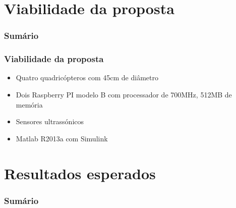 \documentclass{beamer}
\begin{document}
\section{Viabilidade da proposta}

\begin{frame}
	\frametitle{Sumário}
	\tableofcontents[currentsection]
\end{frame}

\begin{frame}
	
	\frametitle{Viabilidade da proposta}
	
	\begin{itemize}	
		
		\item  Quatro quadricópteros com 45cm de diâmetro
		
		\item Dois Raspberry PI modelo B com processador de 700MHz, 512MB de memória
		
		\item Sensores ultrassónicos
		
		\item Matlab R2013a com Simulink
		
	\end{itemize}	
	
	
\end{frame}	

\section{Resultados esperados}

\begin{frame}
	\frametitle{Sumário}
	\tableofcontents[currentsection]
\end{frame}
\end{document}
